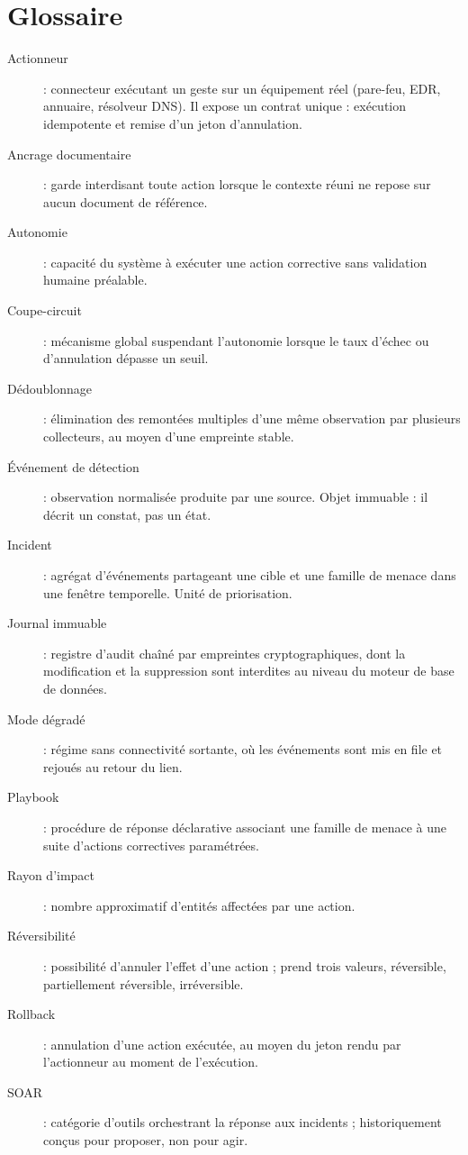 \chapter*{Glossaire}
\begin{description}
    \item[Actionneur] : connecteur ex\'ecutant un geste sur un \'equipement r\'eel
      (pare-feu, EDR, annuaire, r\'esolveur DNS). Il expose un contrat unique :
      ex\'ecution idempotente et remise d'un jeton d'annulation.
    \item[Ancrage documentaire] : garde interdisant toute action lorsque le
      contexte r\'euni ne repose sur aucun document de r\'ef\'erence.
    \item[Autonomie] : capacit\'e du syst\`eme \`a ex\'ecuter une action corrective sans
      validation humaine pr\'ealable.
    \item[Coupe-circuit] : m\'ecanisme global suspendant l'autonomie lorsque le taux
      d'\'echec ou d'annulation d\'epasse un seuil.
    \item[D\'edoublonnage] : \'elimination des remont\'ees multiples d'une m\^eme
      observation par plusieurs collecteurs, au moyen d'une empreinte stable.
    \item[\'Ev\'enement de d\'etection] : observation normalis\'ee produite par une
      source. Objet immuable : il d\'ecrit un constat, pas un \'etat.
    \item[Incident] : agr\'egat d'\'ev\'enements partageant une cible et une famille de
      menace dans une fen\^etre temporelle. Unit\'e de priorisation.
    \item[Journal immuable] : registre d'audit cha\^in\'e par empreintes
      cryptographiques, dont la modification et la suppression sont interdites au
      niveau du moteur de base de donn\'ees.
    \item[Mode d\'egrad\'e] : r\'egime sans connectivit\'e sortante, o\`u les \'ev\'enements
      sont mis en file et rejou\'es au retour du lien.
    \item[Playbook] : proc\'edure de r\'eponse d\'eclarative associant une famille de
      menace \`a une suite d'actions correctives param\'etr\'ees.
    \item[Rayon d'impact] : nombre approximatif d'entit\'es affect\'ees par une action.
    \item[R\'eversibilit\'e] : possibilit\'e d'annuler l'effet d'une action ; prend trois
      valeurs, r\'eversible, partiellement r\'eversible, irr\'eversible.
    \item[Rollback] : annulation d'une action ex\'ecut\'ee, au moyen du jeton rendu par
      l'actionneur au moment de l'ex\'ecution.
    \item[SOAR] : cat\'egorie d'outils orchestrant la r\'eponse aux incidents ;
      historiquement con\c cus pour proposer, non pour agir.
\end{description}
